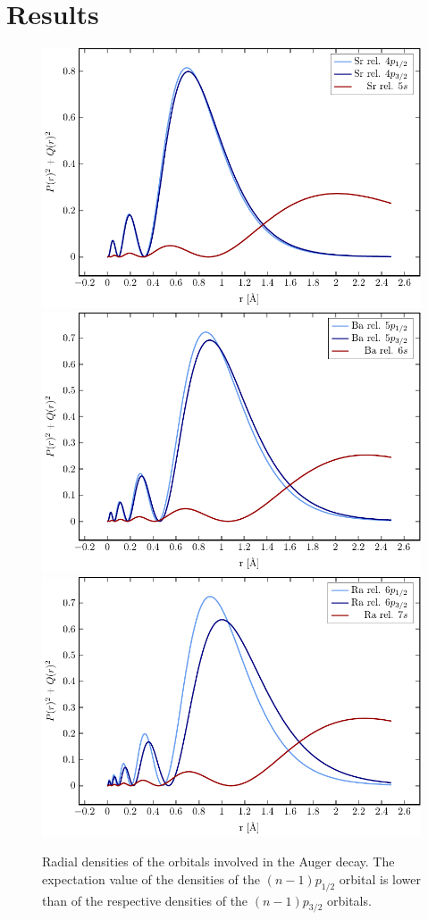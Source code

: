 \section{Results}

\begin{figure}[h]
 \centering
 \includegraphics[width=\columnwidth]{pics/sr_R.pdf}\\
 \includegraphics[width=\columnwidth]{pics/ba_R.pdf}\\
 \includegraphics[width=\columnwidth]{pics/ra_R.pdf}\\
 \caption{Radial densities of the orbitals involved in the Auger decay.
          The expectation value of the densities of the $(n-1)p_{1/2}$
          orbital is lower than of the respective densities of the $(n-1)p_{3/2}$
          orbitals.}
 \label{fig:radial}
\end{figure}
